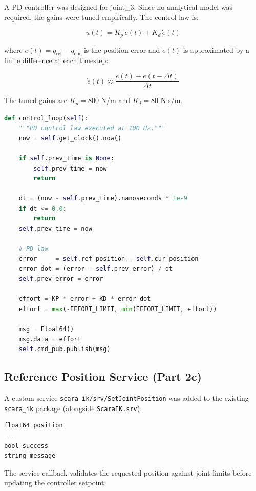 \documentclass[12pt]{article}
\begin{document}
A PD controller was designed for joint\_3. Since no analytical model was
required, the gains were tuned empirically. The control law is:

\[
u(t) = K_p \, e(t) + K_d \, \dot{e}(t)
\]

where $e(t) = q_{\text{ref}} - q_{\text{cur}}$ is the position error and
$\dot{e}(t)$ is approximated by a finite difference at each timestep:

\[
\dot{e}(t) \approx \frac{e(t) - e(t - \Delta t)}{\Delta t}
\]

The tuned gains are $K_p = 800$ N/m and $K_d = 80$ N$\cdot$s/m.

\begin{lstlisting}[style=ros, language=Python,
    caption={PD control loop in \texttt{controller\_node.py}}]
def control_loop(self):
    """PD control law executed at 100 Hz."""
    now = self.get_clock().now()

    if self.prev_time is None:
        self.prev_time = now
        return

    dt = (now - self.prev_time).nanoseconds * 1e-9
    if dt <= 0.0:
        return
    self.prev_time = now

    # PD law
    error     = self.ref_position - self.cur_position
    error_dot = (error - self.prev_error) / dt
    self.prev_error = error

    effort = KP * error + KD * error_dot
    effort = max(-EFFORT_LIMIT, min(EFFORT_LIMIT, effort))

    msg = Float64()
    msg.data = effort
    self.cmd_pub.publish(msg)
\end{lstlisting}

\subsection{Reference Position Service (Part 2c)}

A custom service \texttt{scara\_ik/srv/SetJointPosition} was added to the
existing \texttt{scara\_ik} package (alongside \texttt{ScaraIK.srv}):

\begin{lstlisting}[style=ros, caption={SetJointPosition.srv}]
float64 position
---
bool success
string message
\end{lstlisting}

The service callback validates the requested position against joint limits
before updating the controller setpoint:
\end{document}
